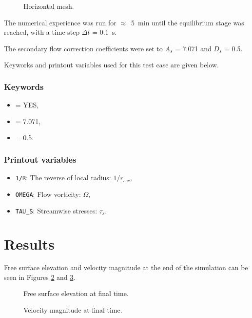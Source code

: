 \begin{figure}[!htbp]
 \centering
 \caption{Horizontal mesh.}
 \label{t2d:seccurrents:fig:mesh}
\end{figure}

The numerical experience was run for $\approx$~5~min until the equilibrium stage
was reached, with a time step $\Delta t$ = 0.1~s.

The secondary flow correction coefficients were set to $A_s$ = 7.071 and $D_s$ = 0.5.

Keyworks and printout variables used for this test case are given below.

\subsubsection{Keywords}
\begin{itemize}
\item {} = YES,
\item {} = 7.071,
\item {} = 0.5.
\end{itemize}

\subsubsection{Printout variables}
\begin{itemize}
\item \texttt{1/R}: The reverse of local radius: $1/r_{sec}$,
\item \texttt{OMEGA}: Flow vorticity: $\Omega$,
\item \texttt{TAU\_S}: Streamwise stresses: $\tau_s$.
\end{itemize}

\section{Results}

Free surface elevation and velocity magnitude at the end of the simulation
can be seen in Figures \ref{fig:seccurrents:FreeSurface} and
\ref{fig:seccurrents:Velocity}.

\begin{figure}[H]
 \centering
 \caption{Free surface elevation at final time.}
 \label{fig:seccurrents:FreeSurface}
\end{figure}

\begin{figure}[H]
 \centering
 \caption{Velocity magnitude at final time.}
 \label{fig:seccurrents:Velocity}
\end{figure}
